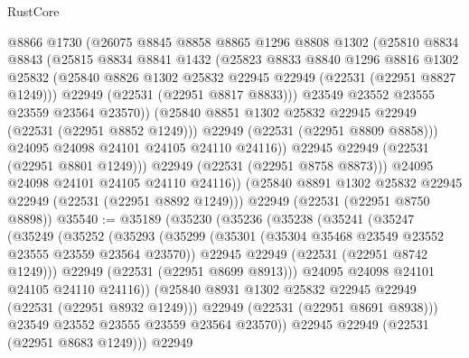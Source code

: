 \begin{lexlean}{RustCore}
\begin{coremodule}
                @8866
                @1730
                (@26075
                  @8845
                  @8858
                  @8865
                  @1296
                  @8808
                  @1302
                  (@25810
                    @8834
                    @8843
                    (@25815
                      @8834
                      @8841
                      @1432
                      (@25823
                        @8833
                        @8840
                        @1296
                        @8816
                        @1302
                        @25832
                        (@25840 @8826 @1302 @25832 @22945 @22949 (@22531 (@22951 @8827 @1249)))
                        @22949
                        (@22531 (@22951 @8817 @8833)))
                      @23549
                      @23552
                      @23555
                      @23559
                      @23564
                      @23570))
                  (@25840 @8851 @1302 @25832 @22945 @22949 (@22531 (@22951 @8852 @1249)))
                  @22949
                  (@22531 (@22951 @8809 @8858)))
                @24095
                @24098
                @24101
                @24105
                @24110
                @24116))
            @22945
            @22949
            (@22531 (@22951 @8801 @1249)))
          @22949
          (@22531 (@22951 @8758 @8873)))
        @24095
        @24098
        @24101
        @24105
        @24110
        @24116))
    (@25840 @8891 @1302 @25832 @22945 @22949 (@22531 (@22951 @8892 @1249)))
    @22949
    (@22531 (@22951 @8750 @8898))
@35540 := @35189
    (@35230
      (@35236
        (@35238
          (@35241
            (@35247
              (@35249
                (@35252
                  (@35293
                    (@35299
                      (@35301 (@35304 @35468 @23549 @23552 @23555 @23559 @23564 @23570))
                      @22945
                      @22949
                      (@22531 (@22951 @8742 @1249)))
                    @22949
                    (@22531 (@22951 @8699 @8913)))
                  @24095
                  @24098
                  @24101
                  @24105
                  @24110
                  @24116))
              (@25840 @8931 @1302 @25832 @22945 @22949 (@22531 (@22951 @8932 @1249)))
              @22949
              (@22531 (@22951 @8691 @8938)))
            @23549
            @23552
            @23555
            @23559
            @23564
            @23570))
        @22945
        @22949
        (@22531 (@22951 @8683 @1249)))
      @22949

\end{coremodule}
\end{lexlean}
